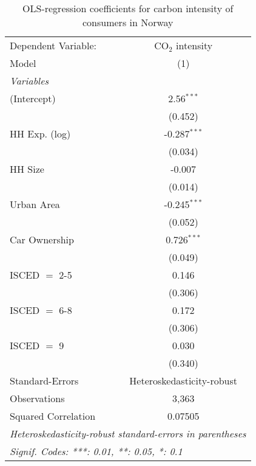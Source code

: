 
\begin{table}[htbp!]
   \centering
   \small
   \begin{adjustbox}{width = 1\textwidth, max height = 0.95\textheight, center}
      \begin{threeparttable}[b]
         \caption{\label{tab:OLS_1_NOR} OLS-regression coefficients for carbon intensity of consumers in Norway}
         \begin{tabular}{lc}
            \tabularnewline \midrule \midrule
            Dependent Variable: & CO$_{2}$ intensity\\  
            Model               & (1)\\  
            \midrule
            \emph{Variables}\\
            (Intercept)         & 2.56$^{***}$\\   
                                & (0.452)\\   
            HH Exp. (log)       & -0.287$^{***}$\\   
                                & (0.034)\\   
            HH Size             & -0.007\\   
                                & (0.014)\\   
            Urban Area          & -0.245$^{***}$\\   
                                & (0.052)\\   
            Car Ownership       & 0.726$^{***}$\\   
                                & (0.049)\\   
            ISCED $=$ 2-5       & 0.146\\   
                                & (0.306)\\   
            ISCED $=$ 6-8       & 0.172\\   
                                & (0.306)\\   
            ISCED $=$ 9         & 0.030\\   
                                & (0.340)\\   
            \midrule 
            Standard-Errors     & Heteroskedasticity-robust \\   
            Observations        & 3,363\\  
            Squared Correlation & 0.07505\\  
            \midrule \midrule
            \multicolumn{2}{l}{\emph{Heteroskedasticity-robust standard-errors in parentheses}}\\
            \multicolumn{2}{l}{\emph{Signif. Codes: ***: 0.01, **: 0.05, *: 0.1}}\\
         \end{tabular}
         

\end{threeparttable}
\end{adjustbox}
\end{table}
